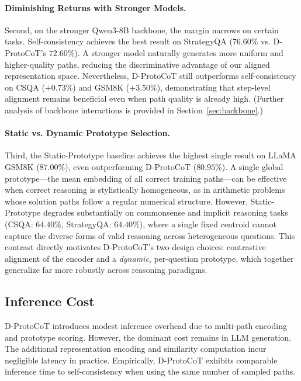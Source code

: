 \documentclass[a4paper,fleqn]{cas-dc}
\begin{document}
\paragraph{Diminishing Returns with Stronger Models.}
Second, on the stronger Qwen3-8B backbone, the margin narrows on certain tasks. Self-consistency achieves the best result on StrategyQA ($76.60\%$ vs. D-ProtoCoT's $72.60\%$). A stronger model naturally generates more uniform and higher-quality paths, reducing the discriminative advantage of our aligned representation space. Nevertheless, D-ProtoCoT still outperforms self-consistency on CSQA ($+0.73\%$) and GSM8K ($+3.50\%$), demonstrating that step-level alignment remains beneficial even when path quality is already high. (Further analysis of backbone interactions is provided in Section~\ref{sec:backbone}.)

\paragraph{Static vs. Dynamic Prototype Selection.}
Third, the Static-Prototype baseline achieves the highest single result on LLaMA GSM8K ($87.00\%$), even outperforming D-ProtoCoT ($80.95\%$). A single global prototype---the mean embedding of all correct training paths---can be effective when correct reasoning is stylistically homogeneous, as in arithmetic problems whose solution paths follow a regular numerical structure. However, Static-Prototype degrades substantially on commonsense and implicit reasoning tasks (CSQA: $64.40\%$, StrategyQA: $64.40\%$), where a single fixed centroid cannot capture the diverse forms of valid reasoning across heterogeneous questions. This contrast directly motivates D-ProtoCoT's two design choices: contrastive alignment of the encoder and a \emph{dynamic}, per-question prototype, which together generalize far more robustly across reasoning paradigms.

\subsection{Inference Cost}

D-ProtoCoT introduces modest inference overhead due to multi-path encoding and prototype scoring. However, the dominant cost remains in LLM generation. The additional representation encoding and similarity computation incur negligible latency in practice. Empirically, D-ProtoCoT exhibits comparable inference time to self-consistency when using the same number of sampled paths.
\end{document}
